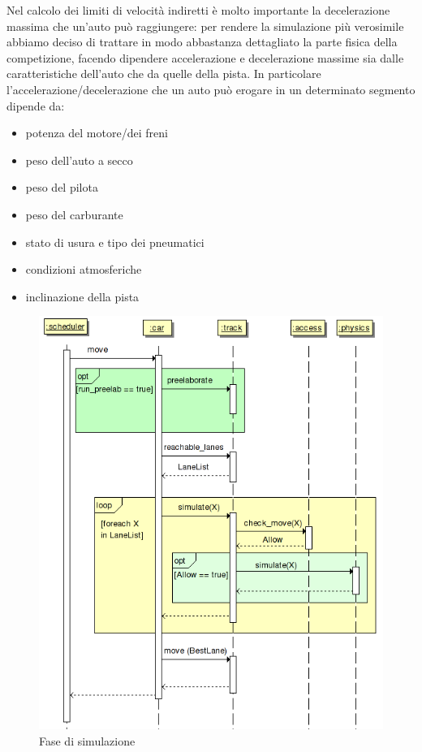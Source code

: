 \documentclass[a4paper]{report}
\begin{document}
Nel calcolo dei limiti di velocità indiretti è molto importante la decelerazione massima che un'auto può raggiungere: per rendere la simulazione più verosimile abbiamo deciso di trattare in modo abbastanza dettagliato la parte fisica della competizione, facendo dipendere accelerazione e decelerazione massime sia dalle caratteristiche dell'auto che da quelle della pista.
In particolare l'accelerazione/decelerazione che un auto può erogare in un determinato segmento dipende da:
\begin{itemize}
\item potenza del motore/dei freni
\item peso dell'auto a secco
\item peso del pilota
\item peso del carburante
\item stato di usura e tipo dei pneumatici
\item condizioni atmosferiche
\item inclinazione della pista
\end{itemize}

\begin{figure}
\includegraphics[width=\textwidth]{diagrammi/Simulation}
\caption{Fase di simulazione}
\label{fig:simulation}
\end{figure}
\end{document}
